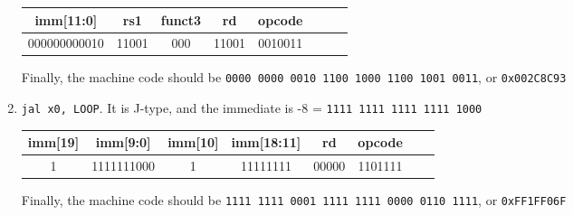 \documentclass[11pt,a4paper]{article}
\begin{document}
\begin{enumerate}[1)]
\begin{center}
\begin{tabular}{|c|c|c|c|c|c|c|c|}
\hline imm[11:0] & rs1 & funct3 & rd & opcode \\
\hline 000000000010 & 11001 & 000 & 11001 & 0010011 \\
\hline
\end{tabular}
\end{center}

Finally, the machine code should be \verb|0000 0000 0010 1100 1000 1100 1001 0011|, or  \verb|0x002C8C93|

\item \verb|jal x0, LOOP|. It is J-type, and the immediate is -8 =  \verb|1111 1111 1111 1111 1000|
    
\begin{center}
\begin{tabular}{|c|c|c|c|c|c|c|c|}
\hline imm[19] & imm[9:0] & imm[10] & imm[18:11] & rd & opcode \\
\hline 1 & 1111111000 & 1 & 11111111 & 00000 & 1101111 \\
\hline
\end{tabular}
\end{center}

Finally, the machine code should be \verb|1111 1111 0001 1111 1111 0000 0110 1111|, or  \verb|0xFF1FF06F|

\end{enumerate}
\end{document}
